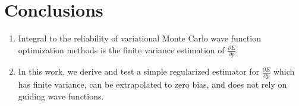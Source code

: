\documentclass{article}
\begin{document}
\section{Conclusions}
\begin{enumerate}
\item Integral to the reliability of variational Monte Carlo wave function optimization methods is the finite variance estimation of $\frac{\partial E}{\partial p}$.

\item  In this work, we derive and test a simple regularized estimator for $\frac{\partial E}{\partial p}$ which has finite variance, can be extrapolated to zero bias, and does not rely on guiding wave functions.
\end{enumerate}



\end{document}

